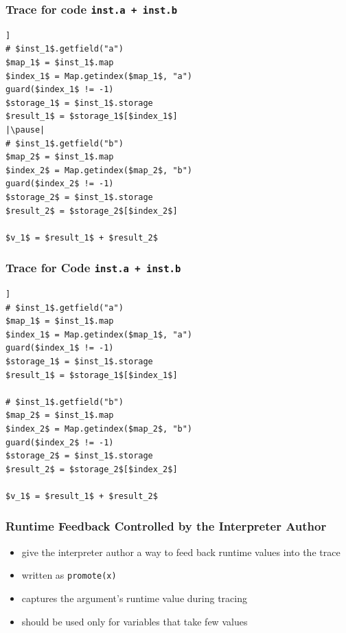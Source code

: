 \documentclass[utf8x]{beamer}
\begin{document}
\begin{frame}
\frametitle{Trace for code \texttt{inst.a + inst.b}}
\begin{lstlisting}[mathescape,escapechar=|,basicstyle=\ttfamily]]
# $inst_1$.getfield("a")
$map_1$ = $inst_1$.map
$index_1$ = Map.getindex($map_1$, "a")
guard($index_1$ != -1)
$storage_1$ = $inst_1$.storage
$result_1$ = $storage_1$[$index_1$]
|\pause|
# $inst_1$.getfield("b")
$map_2$ = $inst_1$.map
$index_2$ = Map.getindex($map_2$, "b")
guard($index_2$ != -1)
$storage_2$ = $inst_1$.storage
$result_2$ = $storage_2$[$index_2$]

$v_1$ = $result_1$ + $result_2$
\end{lstlisting}
\end{frame}

\begin{frame}
\frametitle{Trace for Code \texttt{inst.a + inst.b}}
\begin{lstlisting}[mathescape,escapechar=|,basicstyle=\ttfamily]]
# $inst_1$.getfield("a")
$map_1$ = $inst_1$.map
$index_1$ = Map.getindex($map_1$, "a")
guard($index_1$ != -1)
$storage_1$ = $inst_1$.storage
$result_1$ = $storage_1$[$index_1$]

# $inst_1$.getfield("b")
$map_2$ = $inst_1$.map
$index_2$ = Map.getindex($map_2$, "b")
guard($index_2$ != -1)
$storage_2$ = $inst_1$.storage
$result_2$ = $storage_2$[$index_2$]

$v_1$ = $result_1$ + $result_2$
\end{lstlisting}
\end{frame}

\begin{frame}[containsverbatim]
  \frametitle{Runtime Feedback Controlled by the Interpreter Author}
  \begin{itemize}
      \item give the interpreter author a way to feed back runtime values into the trace
      \item written as \texttt{promote(x)}
      \item captures the argument's runtime value during tracing
      \item should be used only for variables that take few values
  \end{itemize}
  \pause
\end{frame}
\end{document}
